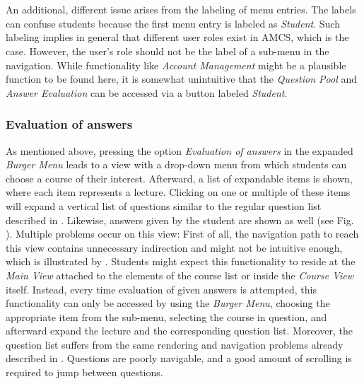 \\
\\
An additional, different issue arises from the labeling of menu entries. The labels can confuse students because the first menu entry is labeled as \emph{Student}. Such labeling implies in general that different user roles exist in AMCS, which is the case. However, the user's role should not be the label of a sub-menu in the navigation. While functionality like \emph{Account Management} might be a plausible function to be found here, it is somewhat unintuitive that the \emph{Question Pool} and \emph{Answer Evaluation} can be accessed via a button labeled \emph{Student}.

\subsubsection{Evaluation of answers}

As mentioned above, pressing the option \emph{Evaluation of answers} in the expanded \emph{Burger Menu} leads to a view with a drop-down menu from which students can choose a course of their interest. Afterward, a list of expandable items is shown, where each item represents a lecture. Clicking on one or multiple of these items will expand a vertical list of questions similar to the regular question list described in . Likewise, answers given by the student are shown as well (see Fig. \todogrf).
Multiple problems occur on this view: First of all, the navigation path to reach this view contains unnecessary indirection and might not be intuitive enough, which is illustrated by . Students might expect this functionality to reside at the \emph{Main View} attached to the elements of the course list or inside the \emph{Course View} itself. Instead, every time evaluation of given answers is attempted, this functionality can only be accessed by using the \emph{Burger Menu}, choosing the appropriate item from the sub-menu, selecting the course in question, and afterward expand the lecture and the corresponding question list.
Moreover, the question list suffers from the same rendering and navigation problems already described in . Questions are poorly navigable, and a good amount of scrolling is required to jump between questions.


